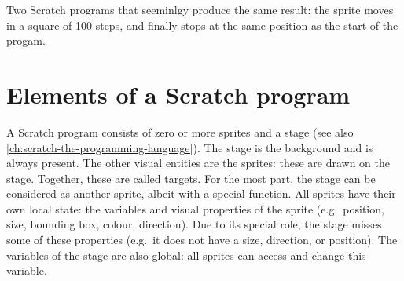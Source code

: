 \documentclass[../main]{subfiles}
\begin{document}
\begin{listing}
    \centering
    \begin{subfigure}{0.45\textwidth}
        \centering
        \begin{scratch}[scale=0.7]
        \end{scratch}
    \end{subfigure}
    \begin{subfigure}{0.45\textwidth}
        \centering
        \begin{scratch}[scale=0.7]
        \end{scratch}
    \end{subfigure}
    \caption{Two Scratch programs that seeminlgy produce the same result: the sprite moves in a square of 100 steps, and finally stops at the same position as the start of the progam.}
    \label{lst:scratch-two-programs}
\end{listing}

\section{Elements of a Scratch program}\label{sec:elements-of-a-scratch-program}

A Scratch program consists of zero or more sprites and a stage (see also \cref{ch:scratch-the-programming-language}).
The stage is the background and is always present.
The other visual entities are the sprites: these are drawn on the stage.
Together, these are called targets.
For the most part, the stage can be considered as another sprite, albeit with a special function.
All sprites have their own local state: the variables and visual properties of the sprite (e.g.\ position, size, bounding box, colour, direction).
Due to its special role, the stage misses some of these properties (e.g.\ it does not have a size, direction, or position).
The variables of the stage are also global: all sprites can access and change this variable.
\end{document}
